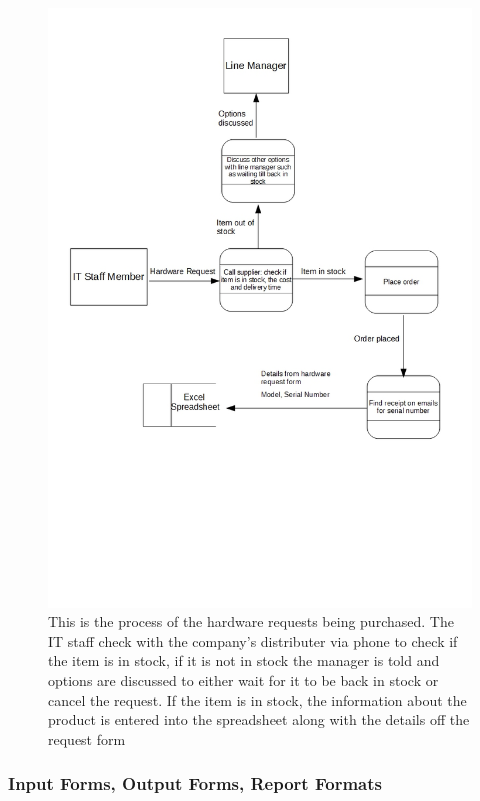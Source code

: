 \begin{figure}[H]
\includegraphics[width=\textwidth]{dataflowdiagram3.jpg}
\caption{This is the process of the hardware requests being purchased. The IT staff check with the company's distributer via phone to check if the item is in stock, if it is not in stock the manager is told and options are discussed to either wait for it to be back in stock or cancel the request. If the item is in stock, the information about the product is entered into the spreadsheet along with the details off the request form} \label{Page1Interview}
\end{figure}

\subsubsection{Input Forms, Output Forms, Report Formats}


